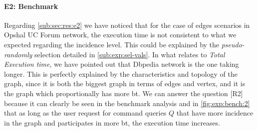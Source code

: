 \paragraph{E2: Benchmark} Regarding \autoref{sub:sec:res:e2} we have noticed that for the case of edges scenarios in Opshal UC Forum network, the execution time is not consistent to what we expected regarding the incidence level. This could be explained by the \emph{pseudo-randomly} selection detailed in \autoref{sub:exp:sel-vals}.
In what relates to \emph{Total Execution time}, we have pointed out that Dbpedia network is the one taking longer. This is perfectly explained by the characteristics and topology of the graph, since it is both the biggest graph in terms of edges and vertex, and it is the graph which proportionally has more \acrshort{bt}. 
We can answer the question [R2] because it can clearly be seen in the benchmark analysis and in \autoref{fig:exp:bench:2} that as long as the user request for command queries $Q$ that have more incidence in the graph and participates in more \acrshort{bt},
the execution time increases.


